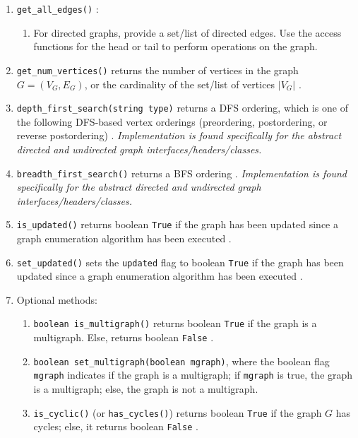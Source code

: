 \begin{enumerate}
\begin{enumerate}
	\item {\tt get\_all\_edges()} \cite[\S13.1.1, pp. 599]{Goodrich2011}: \vspace{-0.2cm}
		\begin{enumerate} \itemsep -2pt
		\item For directed graphs, provide a set/list of directed edges. Use the access functions for the head or tail to perform operations on the graph.
		\end{enumerate}
	\item {\tt get\_num\_vertices()} returns the number of vertices in the graph $G = (V_{G}, E_{G})$, or the cardinality of the set/list of vertices $| V_{G} |$ \cite[\S52.4, pp. 849; \S52.5, pp. 851]{Goldman2008}.
	\item {\tt depth\_first\_search(string type)} returns a DFS ordering, which is one of the following DFS-based vertex orderings (preordering, postordering, or reverse postordering) \cite{WikipediaContributors2018a51}. {\it Implementation is found specifically for the abstract directed and undirected graph interfaces/headers/classes.}
	\item {\tt breadth\_first\_search()} returns a BFS ordering \cite{WikipediaContributors2019}. {\it Implementation is found specifically for the abstract directed and undirected graph interfaces/headers/classes.}
	\item {\tt is\_updated()} returns boolean {\tt True} if the graph has been updated since a graph enumeration algorithm has been executed \cite[\S53.1, pp. 858]{Goldman2008}.
	\item {\tt set\_updated()} sets the {\tt updated} flag to boolean {\tt True} if the graph has been updated since a graph enumeration algorithm has been executed \cite[\S53.1, pp. 858]{Goldman2008}.
	\item Optional methods: \vspace{-0.2cm}
		\begin{enumerate} %
		\item {\tt boolean is\_multigraph()} returns boolean {\tt True} if the graph is a multigraph. Else, returns boolean {\tt False} \cite[\S52.4, pp. 849]{Goldman2008}.
		\item {\tt boolean set\_multigraph(boolean mgraph)}, where the boolean flag {\tt mgraph} indicates if the graph is a multigraph; if {\tt mgraph} is true, the graph is a multigraph; else, the graph is not a multigraph.
		\item {\tt is\_cyclic()} (or {\tt has\_cycles()}) returns boolean {\tt True} if the graph $G$ has cycles; else, it returns boolean {\tt False} \cite[\S52.4, pp. 850]{Goldman2008}.

\end{enumerate}
\end{enumerate}
\end{enumerate}
